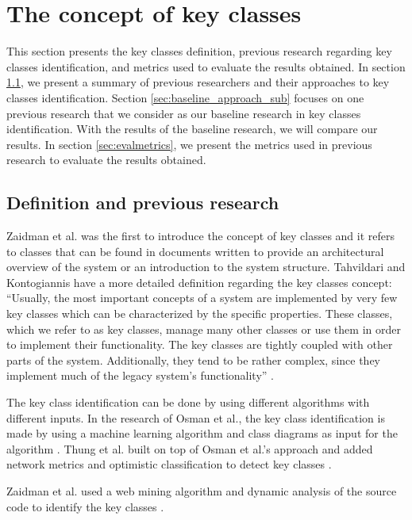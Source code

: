 \documentclass[runningheads]{comsis2}
\begin{document}
\section{The concept of key classes}
\label{sec:baseline_approach}

This section presents the key classes definition, previous research regarding key classes identification, and metrics used to evaluate the results obtained.
In section \ref{sec:keyclass_definition}, we present a summary of previous researchers and their approaches to key classes identification. Section \ref{sec:baseline_approach_sub} focuses on one previous research that we consider as our baseline research in key classes identification. With the results of the baseline research, we will compare our results. 
In section \ref{sec:evalmetrics}, we present the metrics used in previous research to evaluate the results obtained. 


\subsection{Definition and previous research}
\label{sec:keyclass_definition}

Zaidman et al. \cite{ZaidmanJurnal} was the first to introduce the concept of key classes and it refers to classes that can be found in documents written to provide an architectural overview of the system or an introduction to the system structure.
Tahvildari and Kontogiannis have a more detailed definition regarding the key classes concept: “Usually, the most important concepts of a system are implemented by very few key classes which can be characterized by the specific properties. These classes, which we refer to as key classes, manage many other classes or use them in order to implement their functionality. The key classes are tightly coupled with other parts of the system. Additionally, they tend to be rather complex, since they implement much of the legacy system’s functionality” \cite{Tahvildari2004ImprovingDQ}.


The key class identification can be done by using different algorithms with different inputs. In the research of Osman et al., the key class identification is made by using a machine learning algorithm and class diagrams as input for the algorithm \cite{6676885}. Thung et al. built on top of Osman et al.’s approach and added network metrics and optimistic classification to detect key classes \cite{rocclasification}.

Zaidman et al. used a web mining algorithm and dynamic analysis of the source code to identify the key classes \cite{ZaidmanJurnal}.
\end{document}
